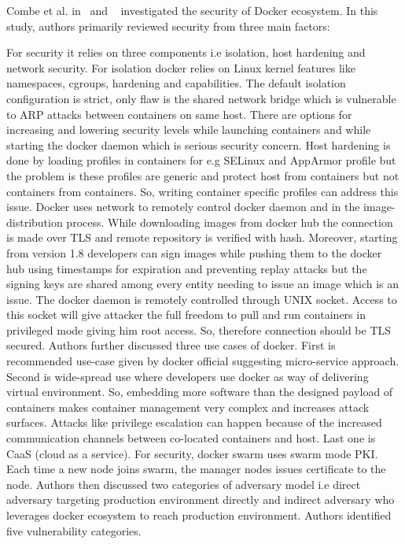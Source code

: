 Combe et al. in~\cite{combe2016docker} and ~\cite{martin2018docker} investigated the security of
Docker ecosystem. In this study, authors primarily reviewed security
from three main factors:

For security it relies on three components i.e 
isolation, host hardening and network security. For isolation 
docker relies on Linux kernel features like namespaces, cgroups, 
hardening and capabilities. The default isolation configuration 
is strict, only flaw is the shared network bridge which is 
vulnerable to ARP attacks between containers on same host. 
There are options for increasing and lowering security levels 
while launching containers and while starting the docker daemon 
which is serious security concern. Host hardening is done by 
loading profiles in containers for e.g SELinux and AppArmor 
profile but the problem is these profiles are generic and protect 
host from containers but not containers from containers. So, writing 
container specific profiles can address this issue. Docker uses network 
to remotely control docker daemon and in the image-distribution process. 
While downloading images from docker hub the connection is made over TLS 
and remote repository is verified with hash. Moreover, starting from version 
1.8 developers can sign images while pushing them to the docker hub using 
timestamps for expiration and preventing replay attacks but the signing keys 
are shared among every entity needing to issue an image which is an issue. 
The docker daemon is remotely controlled through UNIX socket. Access to this 
socket will give attacker the full freedom to pull and run containers in 
privileged mode giving him root access. So, therefore connection should be 
TLS secured.
Authors further discussed three use cases of docker. First is recommended 
use-case given by docker official suggesting micro-service approach. Second 
is wide-spread use where developers use docker as way of delivering virtual 
environment. So, embedding more software than the designed payload of containers 
makes container management very complex and increases attack surfaces. Attacks 
like privilege escalation can happen because of the increased communication 
channels between co-located containers and host. Last one is CaaS (cloud as a 
service). For security, docker swarm uses swarm mode PKI. Each time a new node 
joins swarm, the manager nodes issues certificate to the node.
Authors then discussed two categories of adversary model i.e direct adversary 
targeting production environment directly and indirect adversary who leverages 
docker ecosystem to reach production environment. Authors identified five 
vulnerability categories.

